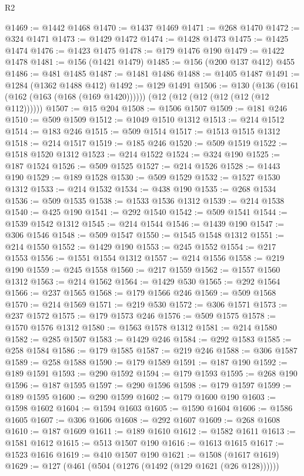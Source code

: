 \begin{lexlean}{R2}
\begin{coremodule}
@1469 := @1442 @1468
@1470 := @1437 @1469
@1471 := @268 @1470
@1472 := @324 @1471
@1473 := @1429 @1472
@1474 := @1428 @1473
@1475 := @1425 @1474
@1476 := @1423 @1475
@1478 := @179 @1476 @190
@1479 := @1422 @1478
@1481 := @156 (@1421 @1479)
@1485 := @156 (@200 @137 @412) @455
@1486 := @481 @1485
@1487 := @1481 @1486
@1488 := @1405 @1487
@1491 := @1284 (@1362 @1488 @412)
@1492 := @129 @1491
@1506 := @130
    (@136 (@161 (@162 (@163 (@168 (@169 @1420))))))
    (@12 (@12 (@12 (@12 (@12 (@12 @112))))))
@1507 := @15 @204
@1508 := @1506 @1507
@1509 := @181 @246
@1510 := @509 @1509
@1512 := @1049 @1510 @1312
@1513 := @214 @1512
@1514 := @183 @246
@1515 := @509 @1514
@1517 := @1513 @1515 @1312
@1518 := @214 @1517
@1519 := @185 @246
@1520 := @509 @1519
@1522 := @1518 @1520 @1312
@1523 := @214 @1522
@1524 := @324 @190
@1525 := @187 @1524
@1526 := @509 @1525
@1527 := @214 @1526
@1528 := @1443 @190
@1529 := @189 @1528
@1530 := @509 @1529
@1532 := @1527 @1530 @1312
@1533 := @214 @1532
@1534 := @438 @190
@1535 := @268 @1534
@1536 := @509 @1535
@1538 := @1533 @1536 @1312
@1539 := @214 @1538
@1540 := @425 @190
@1541 := @292 @1540
@1542 := @509 @1541
@1544 := @1539 @1542 @1312
@1545 := @214 @1544
@1546 := @1439 @190
@1547 := @306 @1546
@1548 := @509 @1547
@1550 := @1545 @1548 @1312
@1551 := @214 @1550
@1552 := @1429 @190
@1553 := @245 @1552
@1554 := @217 @1553
@1556 := @1551 @1554 @1312
@1557 := @214 @1556
@1558 := @219 @190
@1559 := @245 @1558
@1560 := @217 @1559
@1562 := @1557 @1560 @1312
@1563 := @214 @1562
@1564 := @1429 @530
@1565 := @292 @1564
@1566 := @237 @1565
@1568 := @179 @1566 @246
@1569 := @509 @1568
@1570 := @214 @1569
@1571 := @219 @530
@1572 := @306 @1571
@1573 := @237 @1572
@1575 := @179 @1573 @246
@1576 := @509 @1575
@1578 := @1570 @1576 @1312
@1580 := @1563 @1578 @1312
@1581 := @214 @1580
@1582 := @285 @1507
@1583 := @1429 @246
@1584 := @292 @1583
@1585 := @258 @1584
@1586 := @179 @1585
@1587 := @219 @246
@1588 := @306 @1587
@1589 := @258 @1588
@1590 := @179 @1589
@1591 := @187 @190
@1592 := @189 @1591
@1593 := @290 @1592
@1594 := @179 @1593
@1595 := @268 @190
@1596 := @187 @1595
@1597 := @290 @1596
@1598 := @179 @1597
@1599 := @189 @1595
@1600 := @290 @1599
@1602 := @179 @1600 @190
@1603 := @1598 @1602
@1604 := @1594 @1603
@1605 := @1590 @1604
@1606 := @1586 @1605
@1607 := @306 @1606
@1608 := @292 @1607
@1609 := @268 @1608
@1610 := @187 @1609
@1611 := @189 @1610
@1612 := @1582 @1611
@1613 := @1581 @1612
@1615 := @513 @1507 @190
@1616 := @1613 @1615
@1617 := @1523 @1616
@1619 := @410 @1507 @190
@1621 := @1508 (@1617 @1619)
@1629 := @127 (@461 (@504 (@1276 (@1492 (@129 @1621 (@26 @128))))))

\end{coremodule}
\end{lexlean}
